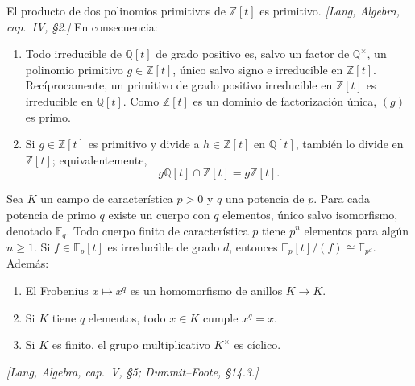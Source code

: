 \begin{prop}
\label{prop:s08-gauss}
El producto de dos polinomios primitivos de $\mathbb Z[t]$ es primitivo. \emph{[Lang, Algebra, cap.~IV, \S2.]} En consecuencia:
\begin{enumerate}[label=(G\arabic*)]
\item Todo irreducible de $\mathbb Q[t]$ de grado positivo es, salvo un factor de $\mathbb Q^\times$, un polinomio primitivo $g\in\mathbb Z[t]$, único salvo signo e irreducible en $\mathbb Z[t]$. Recíprocamente, un primitivo de grado positivo irreducible en $\mathbb Z[t]$ es irreducible en $\mathbb Q[t]$. Como $\mathbb Z[t]$ es un dominio de factorización única, $(g)$ es primo.
\item Si $g\in\mathbb Z[t]$ es primitivo y divide a $h\in\mathbb Z[t]$ en $\mathbb Q[t]$, también lo divide en $\mathbb Z[t]$; equivalentemente,
\[
g\mathbb Q[t]\cap\mathbb Z[t]=g\mathbb Z[t].
\]
\end{enumerate}
\end{prop}

\begin{prop}
\label{prop:s08-cuerpos-finitos}
Sea $K$ un campo de característica $p>0$ y $q$ una potencia de $p$.
Para cada potencia de primo $q$ existe un cuerpo con $q$ elementos, único salvo isomorfismo, denotado $\mathbb F_q$. Todo cuerpo finito de característica $p$ tiene $p^n$ elementos para algún $n\geq1$. Si $f\in\mathbb F_p[t]$ es irreducible de grado $d$, entonces $\mathbb F_p[t]/(f)\cong\mathbb F_{p^d}$. Además:
\begin{enumerate}[label=(E\arabic*)]
\item El Frobenius $x\mapsto x^q$ es un homomorfismo de anillos $K\to K$.
\item Si $K$ tiene $q$ elementos, todo $x\in K$ cumple $x^q=x$.
\item Si $K$ es finito, el grupo multiplicativo $K^\times$ es cíclico.
\end{enumerate}
\emph{[Lang, Algebra, cap.~V, \S5; Dummit--Foote, \S14.3.]}
\end{prop}

